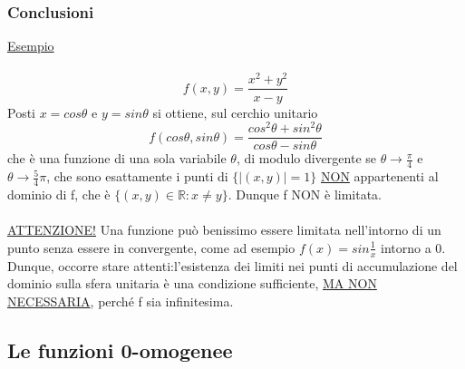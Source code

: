 \documentclass[fontsize = 20px, paper = a4]{article}
\begin{document}
\subsubsection{Conclusioni}
\underline{Esempio} \\ \\
$$f(x,y) = \frac{x^2 + y^2}{x-y}$$
Posti $x = cos\theta$ e $y = sin\theta$ si ottiene, sul cerchio unitario
$$f(cos\theta,sin\theta) = \frac{cos^2\theta + sin^2\theta}{cos\theta - sin\theta}$$
che è una funzione di una sola variabile $\theta$, di modulo divergente se $\theta \to \frac{\pi}{4}$ e $\theta \to\frac{5}{4}\pi$, che sono esattamente i punti di $\{|(x,y)| = 1 \}$ \underline{NON} appartenenti al dominio di f, che è $\{ (x,y) \in \mathbb{R} : x \neq y \}$. Dunque f NON è limitata.\\ \\
\underline{ATTENZIONE!} Una funzione può benissimo essere limitata nell'intorno di un punto senza essere in convergente, come ad esempio $f(x) = sin\frac{1}{x}$ intorno a 0.\\
Dunque, occorre stare attenti:l'esistenza dei limiti nei punti di accumulazione del dominio sulla sfera unitaria è una condizione sufficiente, \underline{MA NON NECESSARIA}, perché f sia infinitesima.\\
\subsection{Le funzioni 0-omogenee}
\end{document}
